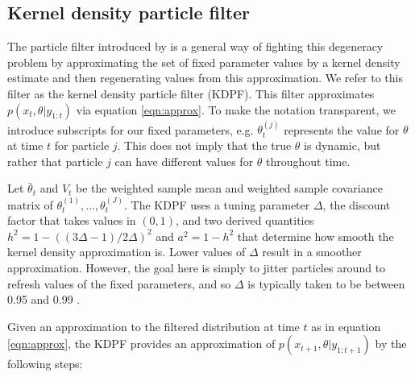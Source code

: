 \documentclass{elsarticle}
\begin{document}
\subsection{Kernel density particle filter \label{sec:kd}}

The particle filter introduced by \citet{Liu:West:comb:2001} is a general way of fighting this degeneracy problem by approximating the set of fixed parameter values by a kernel density estimate and then regenerating values from this approximation. We refer to this filter as the kernel density particle filter (KDPF). This filter approximates $p(x_t,\theta| y_{1:t})$ via equation \eqref{eqn:approx}. To make the notation transparent, we introduce subscripts for our fixed parameters, e.g. $\theta_t^{(j)}$ represents the value for $\theta$ at time $t$ for particle $j$. This does not imply that the true $\theta$ is dynamic, but rather that particle $j$ can have different values for $\theta$ throughout time.

Let $\bar{\theta}_t$ and $V_t$ be the weighted sample mean and weighted sample covariance matrix of $\theta_t^{(1)},\ldots,\theta_t^{(J)}$.  The KDPF uses a tuning parameter $\Delta$, the discount factor that takes values in $(0,1)$, and two derived quantities $h^2 = 1 - ((3\Delta - 1)/2\Delta)^2$ and $a^2 = 1 - h^2$ that determine how smooth the kernel density approximation is. Lower values of $\Delta$ result in a smoother approximation. However, the goal here is simply to jitter particles around to refresh values of the fixed parameters, and so $\Delta$ is typically taken to be between 0.95 and 0.99 \citep{Liu:West:comb:2001}.

Given an approximation to the filtered distribution at time $t$ as in equation \eqref{eqn:approx}, the KDPF provides an approximation of $p(x_{t+1},\theta|y_{1:t+1})$ by the following steps:
\end{document}
